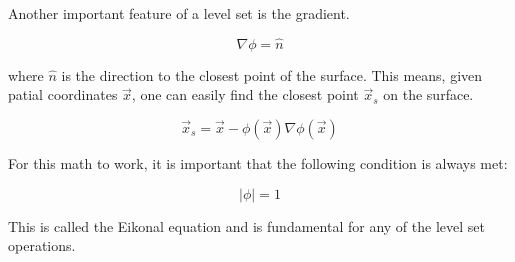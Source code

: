 Another important feature of a level set is the gradient.

\begin{equation}
\nabla \phi = \hat{n}
\end{equation}

where $\hat{n}$ is the direction to the closest point of the surface. This means, given patial coordinates $\vec{x}$, one can easily find the closest point $\vec{x}_s$ on the surface. 

\begin{equation}
\vec{x}_s = \vec{x} - \phi(\vec{x})\nabla \phi(\vec{x})
\end{equation}

For this math to work, it is important that the following condition is always met:

\begin{equation}
|\phi| = 1
\label{eikonaleqfirst}
\end{equation}

This is called the Eikonal equation and is fundamental for any of the level set operations. 
